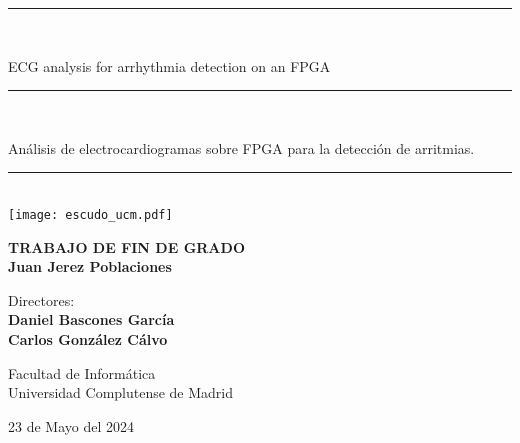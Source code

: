 \begin{titlepage}
	\thispagestyle{empty}

	\begin{center}

		\vspace{1cm}

		\vspace{0.65cm}
		\rule{2in}{0.5pt}\\
		\vspace{0.85cm}

		{\Large ECG analysis for arrhythmia detection on an FPGA}\\

		\vspace{0.65cm}
		\rule{2in}{0.5pt}\\
		\vspace{0.85cm}

		{\Large Análisis de electrocardiogramas sobre FPGA para la detección de arritmias.}\\

		\vspace{0.65cm}
		\rule{2in}{0.5pt}\\



		\vfill
		\texttt{[image: escudo\_ucm.pdf]}
		\vfill

		

		\textbf{TRABAJO DE FIN DE GRADO}\\
		\vspace{0.7cm}
		\textbf{Juan Jerez Poblaciones}

		\vspace{1cm}

		Directores:\\
		\textbf{Daniel Bascones García}\\
		\textbf{Carlos González Cálvo}

		\vspace{1.8cm}
		Facultad de Informática\\
		Universidad Complutense de Madrid
		\vspace{0.5cm}
	   
		23 de Mayo del 2024

		\vspace{0.2cm}

	\end{center}
\end{titlepage}